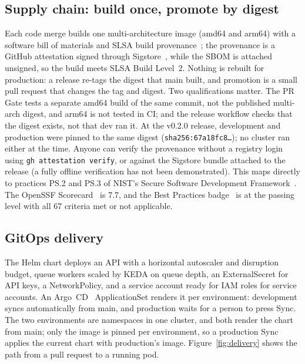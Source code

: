 \documentclass[11pt]{article}
\newcommand{\code}[1]{\texttt{#1}}
\begin{document}
\subsection{Supply chain: build once, promote by digest}
Each code merge builds one multi-architecture image (amd64 and arm64) with a software bill of materials and SLSA build provenance~\citep{slsa}; the provenance is a GitHub attestation signed through Sigstore~\citep{newman2022sigstore}, while the SBOM is attached unsigned, so the build meets SLSA Build Level~2. Nothing is rebuilt for production: a release re-tags the digest that main built, and promotion is a small pull request that changes the tag and digest. Two qualifications matter. The PR Gate tests a separate amd64 build of the same commit, not the published multi-arch digest, and arm64 is not tested in CI; and the release workflow checks that the digest exists, not that dev ran it. At the v0.2.0 release, development and production were pinned to the same digest (\code{sha256:67a18fc8\ldots}); no cluster ran either at the time. Anyone can verify the provenance without a registry login using \code{gh attestation verify}, or against the Sigstore bundle attached to the release (a fully offline verification has not been demonstrated). This maps directly to practices PS.2 and PS.3 of NIST's Secure Software Development Framework~\citep{nist2022ssdf}. The OpenSSF Scorecard~\citep{scorecard} is 7.7, and the Best Practices badge~\citep{bestpractices} is at the passing level with all 67 criteria met or not applicable.

\subsection{GitOps delivery}
The Helm chart deploys an API with a horizontal autoscaler and disruption budget, queue workers scaled by KEDA on queue depth, an ExternalSecret for API keys, a NetworkPolicy, and a service account ready for IAM roles for service accounts. An Argo~CD~\citep{argocd} ApplicationSet renders it per environment: development syncs automatically from main, and production waits for a person to press Sync. The two environments are namespaces in one cluster, and both render the chart from main; only the image is pinned per environment, so a production Sync applies the current chart with production's image. Figure~\ref{fig:delivery} shows the path from a pull request to a running pod.
\end{document}

